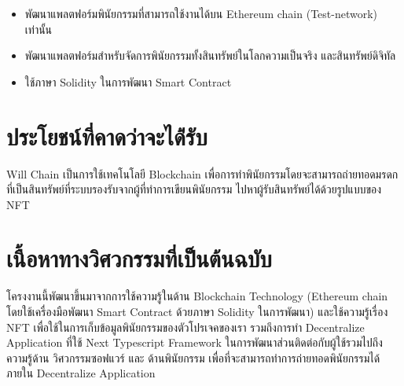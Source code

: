 \documentclass[12pt,oneside,openright,a4paper]{cpe-thai-project}
\begin{document}
\begin{itemize}
\item พัฒนาแพลตฟอร์มพินัยกรรมที่สามารถใช้งานได้บน Ethereum chain (Test-network) เท่านั้น
\item พัฒนาแพลตฟอร์มสำหรับจัดการพินัยกรรมทั้งสินทรัพย์ในโลกความเป็นจริง และสินทรัพย์ดิจิทัล
\item ใช้ภาษา Solidity ในการพัฒนา Smart Contract
\end{itemize}

\section{ประโยชน์ที่คาดว่าจะได้่รับ}
\tab Will Chain เป็นการใช้เทคโนโลยี Blockchain เพื่อการทำพินัยกรรมโดยจะสามารถถ่ายทอดมรดกที่เป็นสินทรัพย์ที่ระบบรองรับจากผู้ที่ทำการเขียนพินัยกรรม ไปหาผู้รับสินทรัพย์ได้ด้วยรูปแบบของ NFT
\section{เนื้อหาทางวิศวกรรมที่เป็นต้นฉบับ}
\tab โครงงานนี้พัฒนาขึ้นมาจากการใช้ความรู้ในด้าน Blockchain Technology (Ethereum chain โดยใช้เครื่องมือพัฒนา Smart Contract ด้วยภาษา Solidity ในการพัฒนา)  และใช้ความรู้เรื่อง NFT เพื่อใช้ในการเก็บข้อมูลพินัยกรรมของตัวโปรเจคของเรา รวมถึงการทำ Decentralize  Application ที่ใช้ Next Typescript Framework ในการพัฒนาส่วนติดต่อกับผู้ใช้รวมไปถึงความรู้ด้าน วิศวกรรมซอฟแวร์ และ ด้านพินัยกรรม เพื่อที่จะสามารถทำการถ่ายทอดพินัยกรรมได้ภายใน Decentralize  Application
\clearpage
\end{document}
